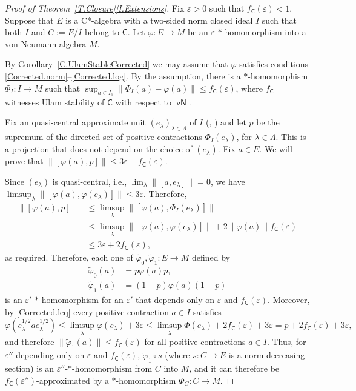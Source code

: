 \documentclass[11pt]{amsproc}
\newcommand{\cstar}{C*}
\newcommand{\sfC}{\mathsf C}
\DeclareMathOperator{\sfvN}{\mathsf {vN}}
\theoremstyle{definition}
\theoremstyle{plain}
\theoremstyle{remark}
\begin{document}
\begin{proof}[Proof of Theorem~\ref{T.Closure}\eqref{I.Extensions}] Fix $\varepsilon>0$ such that $f_\sfC(\varepsilon)<1$.
Suppose that $E$ is a \cstar-algebra with a two-sided norm closed ideal $I$ such that both $I$ and $C:=E/I$ belong to $\sfC$.
Let $\varphi\colon E\to M$ be an $\varepsilon$-$*$-homomorphism into a von Neumann algebra $M$. 

By Corollary~\ref{C.UlamStableCorrected} we may assume that $\varphi$ satisfies conditions \ref{Corrected.norm}--\ref{Corrected.log}. 
By the assumption, there is a $*$-homomorphism $\Phi_I\colon I\to M$ such that $\sup_{a\in I_1} \|\Phi_I(a)-\varphi(a)\|\leq f_{\sfC}(\varepsilon)$, where $f_{\sfC}$ witnesses Ulam stability  of $\sfC$ with respect to $\sfvN$.  

Fix an quasi-central approximate unit $(e_\lambda)_{\lambda\in \Lambda}$ of $I$ (\cite{Arv:Notes}, \cite[\S 1.9]{FarahCT}) and let $p$ be the supremum of  the directed set of positive contractions $\Phi_I(e_\lambda)$, for $\lambda\in \Lambda$. 
This is a projection that does not depend on the choice of $(e_\lambda)$. 
Fix $a\in E$. We will prove that 
$\|[\varphi(a),p]\|\leq 3\varepsilon +f_{\sfC}(\varepsilon)$. 
 
Since $(e_\lambda)$ is quasi-central, i.e., 
$\lim_\lambda \|[a,e_\lambda]\|=0$, we have $\limsup_\lambda \|[\varphi(a),\varphi(e_\lambda)]\|\leq 3\varepsilon$.
  Therefore, 
\begin{align*}
	\|[\varphi(a),p]\|&\leq \limsup_\lambda \|[\varphi(a),\Phi_I(e_\lambda)]\|\\
	&\leq \limsup_\lambda\|[\varphi(a),\varphi(e_\lambda)]\|+2\|\varphi(a)\|f_{\sfC}(\varepsilon)\\
	&\leq 3\varepsilon +2f_{\sfC}(\varepsilon), 
\end{align*}
as required. 
Therefore, each one of $\tilde\varphi_0,\tilde\varphi_1\colon E\to M$ defined by 
\begin{align*}
\tilde \varphi_0(a)&=p\varphi(a)p,\\
\tilde \varphi_1(a)&=(1-p)\varphi(a)(1-p)
\end{align*}
is an $\varepsilon'$-$*$-homomorphism for an $\varepsilon'$ that depends only on $\varepsilon$ and $f_{\sfC}(\varepsilon)$.
Moreover, by \ref{Corrected.leq} every positive contraction $a\in I$ satisfies 
\[
\varphi(e_\lambda^{1/2} a e_{\lambda}^{1/2})\leq \limsup_\lambda \varphi(e_\lambda)+3\varepsilon\leq \limsup_\lambda \Phi(e_\lambda)+2f_{\sfC}(\varepsilon)+3\varepsilon=p+2f_{\sfC}(\varepsilon)+3\varepsilon,  
\] 
and therefore $\|\tilde \varphi_1(a)\|\leq f_\sfC(\varepsilon)$  for all positive contractions $a\in I$. 
Thus, for $\varepsilon''$ depending only on $\varepsilon$ and $f_\sfC(\varepsilon)$,  $\tilde \varphi_1\circ s$ (where $s\colon C\to E$ is a norm-decreasing section) is an $\varepsilon''$-$*$-homomorphism from $C$ into $M$, and it can therefore be $f_{\sfC}(\varepsilon'')$-approximated by a $*$-homomorphism $\Phi_C\colon C\to M$.


\end{proof}
\end{document}
